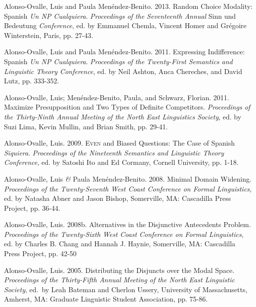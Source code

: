 \documentclass[11pt]{article}
\begin{document}
Alonso-Ovalle, Luis and Paula Men\'endez-Benito. 2013. Random
Choice Modality: Spanish \textit{Un {\em NP}
  Cualquiera}. \textit{Proceedings of the Seventeenth Annual} Sinn und Bedeutung \textit{Conference}, ed. by
Emmanuel Chemla, Vincent Homer and Gr\'egoire Winterstein, Paris, pp. 27-43.

Alonso-Ovalle, Luis and Paula Men\'endez-Benito. 2011. Expressing Indifference: Spanish
\textit{Un {\em NP} Cualquiera}. \textit{Proceedings of the Twenty-First
  Semantics and Linguistic Theory Conference}, ed. by Neil Ashton,
Anca Chereches, and David Lutz, pp. 333-352. 

Alonso-Ovalle, Luis; Men\'endez-Benito, Paula, and Schwarz,
Florian. 2011. Maximize Presupposition and Two Types of Definite
Competitors. \textit{Proceedings of the Thirty-Ninth Annual Meeting of the North East Linguistics
  Society}, ed. by Suzi Lima, Kevin Mullin, and Brian
Smith, pp. 29-41. 


Alonso-Ovalle, Luis. 2009. \textsc{Even} and Biased Questions: The Case of Spanish \textit{Siquiera}. \textit{Proceedings of the Nineteenth Semantics and Linguistic Theory Conference}, ed. by Satoshi Ito and Ed Cormany, Cornell University, pp. 1-18.%


Alonso-Ovalle, Luis \textit{\&} Paula
    Men\'endez-Benito. 2008. Minimal Domain Widening. \textit{Proceedings of the Twenty-Seventh
    West Coast Conference on Formal Linguistics,} ed. by Natasha Abner
  and Jason Bishop,  Somerville, MA: Cascadilla Press Project,
  pp. 36-44.


Alonso-Ovalle, Luis. 2008b. Alternatives in the
  Disjunctive Antecedents Problem. \textit{Proceedings of the Twenty-Sixth
    West Coast Conference on Formal Linguistics}, ed. by Charles
  B. Chang and Hannah J. Haynie, Somerville, MA: Cascadilla Press Project, pp. 42-50


Alonso-Ovalle, Luis. 2005. Distributing the Disjuncts over the Modal Space. \textit{Proceedings of the Thirty-Fifth Annual Meeting of the North East Linguistic Society}, ed.\ by Leah Bateman and Cherlon Ussery,  University of Massachusetts, Amherst, MA: Graduate Linguistic Student Association, pp. 75-86. 
\end{document}
